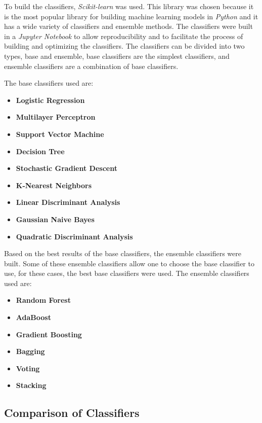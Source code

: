 To build the classifiers, \textit{Scikit-learn} was used. This library was chosen because it is the most popular library for building machine learning models in \textit{Python} and it has a wide variety of classifiers and ensemble methods. The classifiers were built in a \textit{Jupyter Notebook} to allow reproducibility and to facilitate the process of building and optimizing the classifiers. The classifiers can be divided into two types, base and ensemble, base classifiers are the simplest classifiers, and ensemble classifiers are a combination of base classifiers.

The base classifiers used are:
\begin{itemize}
    \item \textbf{Logistic Regression}
    \item \textbf{Multilayer Perceptron}
    \item \textbf{Support Vector Machine}
    \item \textbf{Decision Tree}
    \item \textbf{Stochastic Gradient Descent}
    \item \textbf{K-Nearest Neighbors}
    \item \textbf{Linear Discriminant Analysis}
    \item \textbf{Gaussian Naive Bayes}
    \item \textbf{Quadratic Discriminant Analysis}
\end{itemize}

Based on the best results of the base classifiers, the ensemble classifiers were built. Some of these ensemble classifiers allow one to choose the base classifier to use, for these cases, the best base classifiers were used. The ensemble classifiers used are:
\begin{itemize}
    \item \textbf{Random Forest}
    \item \textbf{AdaBoost}
    \item \textbf{Gradient Boosting}
    \item \textbf{Bagging}
    \item \textbf{Voting}
    \item \textbf{Stacking}
\end{itemize}

\subsection{Comparison of Classifiers}

